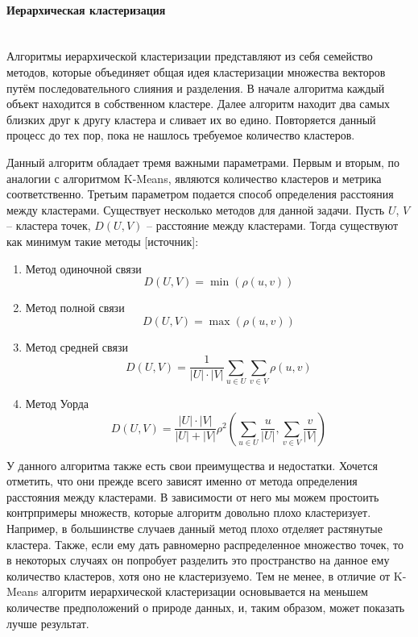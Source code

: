 \paragraph{Иерархическая кластеризация}\mbox{} \\

Алгоритмы иерархической кластеризации представляют из себя семейство методов, которые объединяет общая идея кластеризации множества векторов путём последовательного слияния и разделения. В начале алгоритма каждый объект находится в собственном кластере. Далее алгоритм находит два самых близких друг к другу кластера и сливает их во едино. Повторяется данный процесс до тех пор, пока не нашлось требуемое количество кластеров.

Данный алгоритм обладает тремя важными параметрами. Первым и вторым, по аналогии с алгоритмом K-Means, являются количество кластеров и метрика соответственно. Третьим параметром подается способ определения расстояния между кластерами. Существует несколько методов для данной задачи. Пусть $U$, $V$ -- кластера точек, $D(U, V)$ -- расстояние между кластерами. Тогда существуют как минимум такие методы [источник]:

\begin{enumerate}
    \item Метод одиночной связи $$D(U, V) = \min(\rho(u, v))$$
    \item Метод полной связи $$D(U, V) = \max(\rho(u, v))$$
    \item Метод средней связи $$D(U, V) = \frac{1}{|U| \cdot |V|}\sum_{u \in U} \sum_{v \in V} \rho(u, v)$$
    \item Метод Уорда $$D(U, V) = \frac{|U| \cdot |V|}{|U| + |V|} \rho^2 \left( \sum_{u \in U} \frac{u}{|U|}, \sum_{v \in V} \frac{v}{|V|} \right)$$
\end{enumerate}

У данного алгоритма также есть свои преимущества и недостатки. Хочется отметить, что они прежде всего зависят именно от метода определения расстояния между кластерами. В зависимости от него мы можем простоить контрпримеры множеств, которые алгоритм довольно плохо кластеризует. Например, в большинстве случаев данный метод плохо отделяет растянутые кластера.
Также, если ему дать равномерно распределенное множество точек, то в некоторых случаях он попробует разделить это пространство на данное ему количество кластеров, хотя оно не кластеризуемо. Тем не менее, в отличие от K-Means алгоритм иерархической кластеризации основывается на меньшем количестве предположений о природе данных, и, таким образом, может показать лучше результат.

